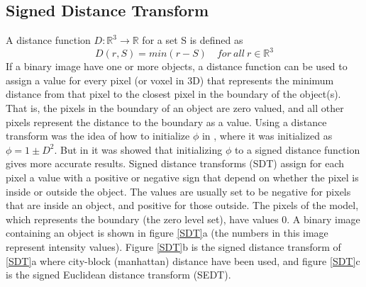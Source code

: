 \subsection{Signed Distance Transform}
A distance function \(D: \mathbb{R}^3 \rightarrow \mathbb{R}\) for a set S is defined as 
\begin{equation}
D(r,S) = min(r-S) \quad for \ all \ r \in{\mathbb{R}^3}
\end{equation}
If a binary image have one or more objects, a distance function can be used to assign a value for every pixel (or voxel in 3D) that represents the minimum distance from that pixel to the closest pixel in the boundary of the object(s). That is, the pixels in the boundary of an object are zero valued, and all other pixels represent the distance to the boundary as a value. Using a distance transform was the idea of how to initialize \(\phi\) in \cite{osher88}, where it was initialized as \(\phi = 1 \pm D^2\). But in \cite{mulder92} it was showed that initializing \(\phi\) to a signed distance function gives more accurate results. Signed distance transforms (SDT) assign for each pixel a value with a positive or negative sign that depend on whether the pixel is inside or outside the object. The values are usually set to be negative for pixels that are inside an object, and positive for those outside. The pixels of the model, which represents the boundary (the zero level set), have values 0. A binary image containing an object is shown in figure \ref{SDT}a (the numbers in this image represent intensity values). Figure \ref{SDT}b is the signed distance transform of \ref{SDT}a where city-block (manhattan) distance have been used, and figure \ref{SDT}c is the signed Euclidean distance transform (SEDT).

